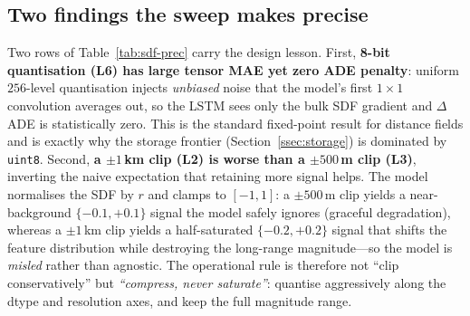 \subsection{Two findings the sweep makes precise}\label{ssec:anomaly}
Two rows of Table~\ref{tab:sdf-prec} carry the design lesson. First,
\textbf{8-bit quantisation (L6) has large tensor MAE yet zero ADE
penalty}: uniform $256$-level quantisation injects \emph{unbiased} noise
that the model's first $1\!\times\!1$ convolution averages out, so the LSTM
sees only the bulk SDF gradient and $\Delta$ADE is statistically zero. This
is the standard fixed-point result for distance fields and is exactly why
the storage frontier (Section~\ref{ssec:storage}) is dominated by
\texttt{uint8}. Second, \textbf{a $\pm1$\,km clip (L2) is worse than a
$\pm500$\,m clip (L3)}, inverting the naive expectation that retaining more
signal helps. The model normalises the SDF by $r$ and clamps to
$[-1,1]$: a $\pm500$\,m clip yields a near-background
$\{-0.1,+0.1\}$ signal the model safely ignores (graceful degradation),
whereas a $\pm1$\,km clip yields a half-saturated $\{-0.2,+0.2\}$ signal
that shifts the feature distribution while destroying the long-range
magnitude---so the model is \emph{misled} rather than agnostic. The
operational rule is therefore not ``clip conservatively'' but
\emph{``compress, never saturate''}: quantise aggressively along the dtype
and resolution axes, and keep the full magnitude range.
